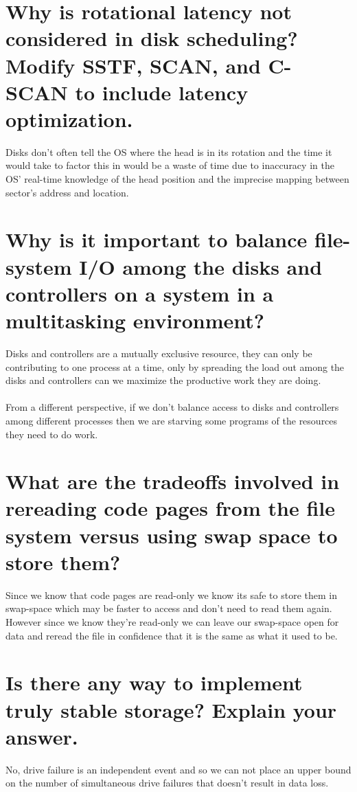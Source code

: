 \documentclass{book}%
\begin{document}
\section{Why is rotational latency not considered in disk scheduling? Modify
SSTF, SCAN, and C-SCAN to include latency optimization.}
Disks don't often tell the OS where the head is in its rotation and the time it
would take to factor this in would be a waste of time due to inaccuracy in the
OS' real-time knowledge of the head position and the imprecise mapping between
sector's address and location.
\section{Why is it important to balance file-system I/O among the disks and
controllers on a system in a multitasking environment?}
Disks and controllers are a mutually exclusive resource, they can only be
contributing to one process at a time, only by spreading the load out among the
disks and controllers can we maximize the productive work they are doing. 
\paragraph{} From a different perspective, if we don't balance access to disks
and controllers among different processes then we are starving some programs of
the resources they need to do work.
\section{What are the tradeoffs involved in rereading code pages from the file
system versus using swap space to store them?}
Since we know that code pages are read-only we know its safe to store them in
swap-space which may be faster to access and don't need to read them again.
However since we know they're read-only we can leave our swap-space open for
data and reread the file in confidence that it is the same as what it 
used to be.
\section{Is there any way to implement truly stable storage? 
Explain your answer.}
No, drive failure is an independent event and so we can not place an upper
bound on the number of simultaneous drive failures that doesn't result in data
loss.
\end{document}
